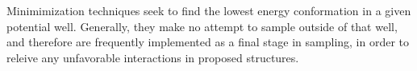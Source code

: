 Minimimization techniques seek to find the lowest energy conformation in a given potential well.
Generally, they make no attempt to sample outside of that well, and therefore are frequently implemented as a final stage in sampling, in order to releive any unfavorable interactions in proposed structures.
